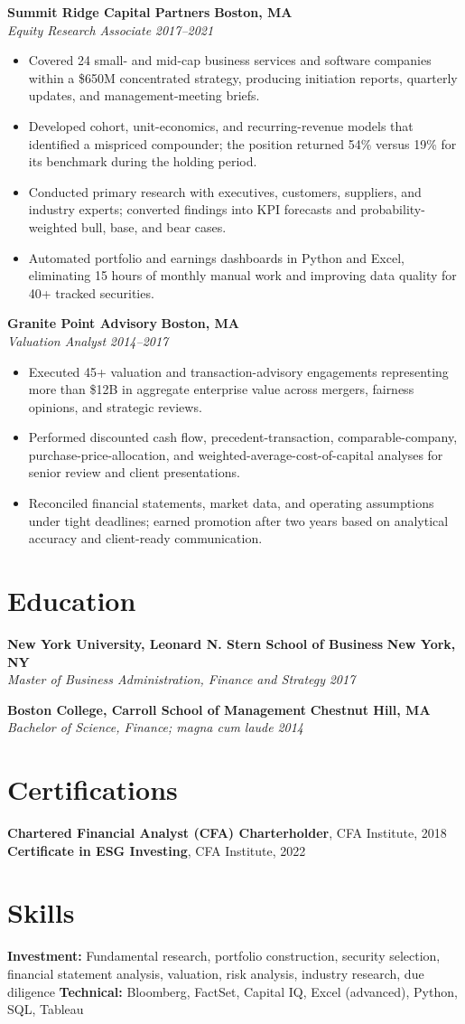 \documentclass[10pt,letterpaper]{article}
\newcommand{\role}[4]{%
  \textbf{#1} \hfill \textbf{#2}\\[-1pt]
  \textit{#3} \hfill \textit{#4}\par
}
\newcommand{\education}[4]{%
  \textbf{#1} \hfill \textbf{#2}\\[-1pt]
  \textit{#3} \hfill \textit{#4}\par
}
\begin{document}
\role{Summit Ridge Capital Partners}{Boston, MA}{Equity Research Associate}{2017--2021}
\begin{itemize}
  \item Covered 24 small- and mid-cap business services and software companies within a \$650M concentrated strategy, producing initiation reports, quarterly updates, and management-meeting briefs.
  \item Developed cohort, unit-economics, and recurring-revenue models that identified a mispriced compounder; the position returned 54\% versus 19\% for its benchmark during the holding period.
  \item Conducted primary research with executives, customers, suppliers, and industry experts; converted findings into KPI forecasts and probability-weighted bull, base, and bear cases.
  \item Automated portfolio and earnings dashboards in Python and Excel, eliminating 15 hours of monthly manual work and improving data quality for 40+ tracked securities.
\end{itemize}

\role{Granite Point Advisory}{Boston, MA}{Valuation Analyst}{2014--2017}
\begin{itemize}
  \item Executed 45+ valuation and transaction-advisory engagements representing more than \$12B in aggregate enterprise value across mergers, fairness opinions, and strategic reviews.
  \item Performed discounted cash flow, precedent-transaction, comparable-company, purchase-price-allocation, and weighted-average-cost-of-capital analyses for senior review and client presentations.
  \item Reconciled financial statements, market data, and operating assumptions under tight deadlines; earned promotion after two years based on analytical accuracy and client-ready communication.
\end{itemize}

\section*{Education}
\education{New York University, Leonard N. Stern School of Business}{New York, NY}{Master of Business Administration, Finance and Strategy}{2017}
\education{Boston College, Carroll School of Management}{Chestnut Hill, MA}{Bachelor of Science, Finance; magna cum laude}{2014}

\section*{Certifications}
\textbf{Chartered Financial Analyst (CFA) Charterholder}, CFA Institute, 2018 \textbar{}
\textbf{Certificate in ESG Investing}, CFA Institute, 2022

\section*{Skills}
\textbf{Investment:} Fundamental research, portfolio construction, security selection, financial statement analysis, valuation, risk analysis, industry research, due diligence \textbar{}
\textbf{Technical:} Bloomberg, FactSet, Capital IQ, Excel (advanced), Python, SQL, Tableau
\end{document}
